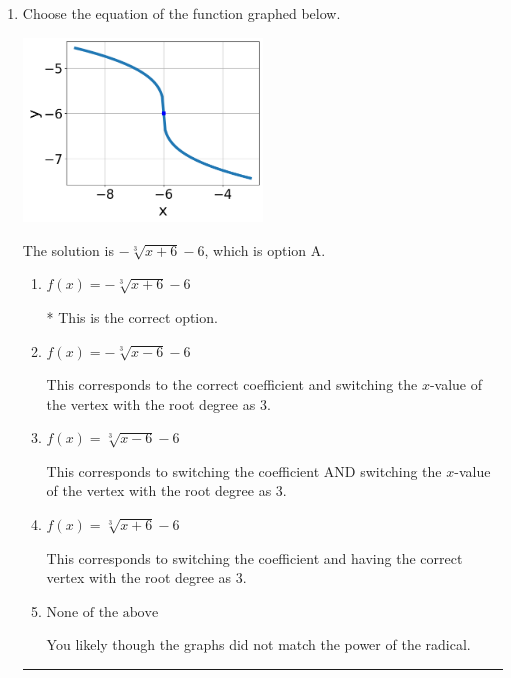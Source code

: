 \documentclass{extbook}[14pt]
\newcommand{\litem}[1]{\item #1

\rule{\textwidth}{0.4pt}}
\begin{document}
\begin{enumerate}\litem{
Choose the equation of the function graphed below.

\begin{center}
    \includegraphics[width=0.5\textwidth]{../Figures/radicalGraphToEquationB.png}
\end{center}


The solution is \( - \sqrt[3]{x + 6} - 6 \), which is option A.\begin{enumerate}[label=\Alph*.]
\item \( f(x) = - \sqrt[3]{x + 6} - 6 \)

* This is the correct option.
\item \( f(x) = - \sqrt[3]{x - 6} - 6 \)

This corresponds to the correct coefficient and switching the $x$-value of the vertex with the root degree as $3$.
\item \( f(x) = \sqrt[3]{x - 6} - 6 \)

This corresponds to switching the coefficient AND switching the $x$-value of the vertex with the root degree as $3$.
\item \( f(x) = \sqrt[3]{x + 6} - 6 \)

This corresponds to switching the coefficient and having the correct vertex with the root degree as $3$.
\item \( \text{None of the above} \)

You likely though the graphs did not match the power of the radical.
\end{enumerate}

}
\end{enumerate}
\end{document}
